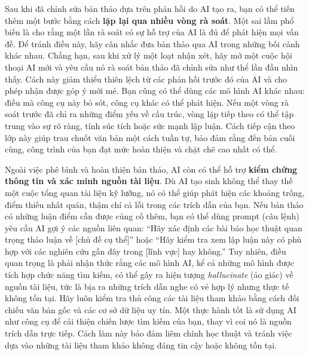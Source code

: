 Sau khi đã chỉnh sửa bản thảo dựa trên phản hồi do AI tạo ra, bạn có thể tiến thêm một bước bằng cách \textbf{lặp lại qua nhiều vòng rà soát}. Một sai lầm phổ biến là cho rằng một lần rà soát có sự hỗ trợ của AI là đủ để phát hiện mọi vấn đề. Để tránh điều này, hãy cân nhắc đưa bản thảo qua AI trong những bối cảnh khác nhau. Chẳng hạn, sau khi xử lý một loạt nhận xét, hãy mở một cuộc hội thoại AI mới và yêu cầu nó rà soát bản thảo đã chỉnh sửa như thể lần đầu nhìn thấy. Cách này giảm thiểu thiên lệch từ các phản hồi trước đó của AI và cho phép nhận được góp ý mới mẻ. Bạn cũng có thể dùng các mô hình AI khác nhau: điều mà công cụ này bỏ sót, công cụ khác có thể phát hiện. Nếu một vòng rà soát trước đã chỉ ra những điểm yếu về cấu trúc, vòng lặp tiếp theo có thể tập trung vào sự rõ ràng, tính súc tích hoặc sức mạnh lập luận. Cách tiếp cận theo lớp này giúp trau chuốt văn bản một cách tuần tự, bảo đảm rằng đến bản cuối cùng, công trình của bạn đạt mức hoàn thiện và chặt chẽ cao nhất có thể.

Ngoài việc phê bình và hoàn thiện bản thảo, AI còn có thể hỗ trợ \textbf{kiểm chứng thông tin và xác minh nguồn tài liệu}. Dù AI tạo sinh không thể thay thế một cuộc tổng quan tài liệu kỹ lưỡng, nó có thể giúp phát hiện các khoảng trống, điểm thiếu nhất quán, thậm chí cả lỗi trong các trích dẫn của bạn. Nếu bản thảo có những luận điểm cần được củng cố thêm, bạn có thể dùng prompt (câu lệnh) yêu cầu AI gợi ý các nguồn liên quan: ``Hãy xác định các bài báo học thuật quan trọng thảo luận về {[}chủ đề cụ thể{]}'' hoặc ``Hãy kiểm tra xem lập luận này có phù hợp với các nghiên cứu gần đây trong {[}lĩnh vực{]} hay không.'' Tuy nhiên, điều quan trọng là phải nhận thức rằng các mô hình AI, kể cả những mô hình được tích hợp chức năng tìm kiếm, có thể gây ra hiện tượng \emph{hallucinate} (ảo giác) về nguồn tài liệu, tức là bịa ra những trích dẫn nghe có vẻ hợp lý nhưng thực tế không tồn tại. Hãy luôn kiểm tra thủ công các tài liệu tham khảo bằng cách đối chiếu văn bản gốc và các cơ sở dữ liệu uy tín. Một thực hành tốt là sử dụng AI như công cụ để cải thiện chiến lược tìm kiếm của bạn, thay vì coi nó là nguồn trích dẫn trực tiếp. Cách làm này bảo đảm liêm chính học thuật và tránh việc dựa vào những tài liệu tham khảo không đáng tin cậy hoặc không tồn tại.

